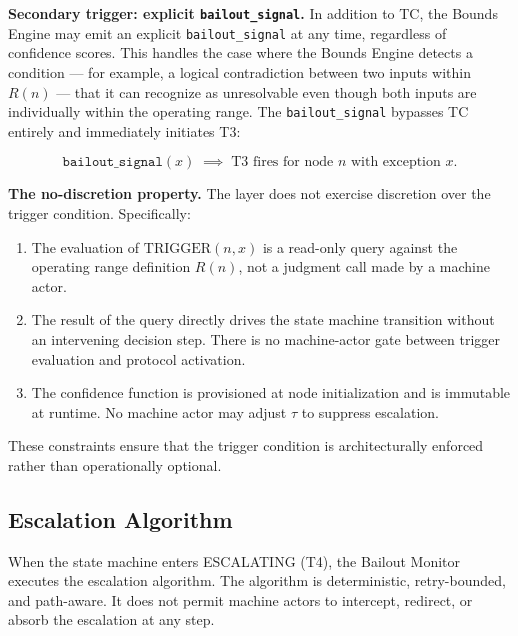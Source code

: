 \bigskip
\noindent\textbf{Secondary trigger: explicit \texttt{bailout\_signal}.} In addition to TC, the Bounds Engine may emit an explicit \texttt{bailout\_signal} at any time, regardless of confidence scores. This handles the case where the Bounds Engine detects a condition — for example, a logical contradiction between two inputs within $R(n)$ — that it can recognize as unresolvable even though both inputs are individually within the operating range. The \texttt{bailout\_signal} bypasses TC entirely and immediately initiates T3:

\begin{equation}
\texttt{bailout\_signal}(x) \;\implies\; \text{T3 fires for node } n \text{ with exception } x. \tag{TC-secondary}
\end{equation}

\bigskip
\noindent\textbf{The no-discretion property.} The \bounds{} layer does not exercise discretion over the trigger condition. Specifically:

\begin{enumerate}
    \item The evaluation of $\text{TRIGGER}(n, x)$ is a read-only query against the operating range definition $R(n)$, not a judgment call made by a machine actor.
    \item The result of the query directly drives the state machine transition without an intervening decision step. There is no machine-actor gate between trigger evaluation and protocol activation.
    \item The confidence function is provisioned at node initialization and is immutable at runtime. No machine actor may adjust $\tau$ to suppress escalation.
\end{enumerate}

These constraints ensure that the trigger condition is architecturally enforced rather than operationally optional.

\subsection{Escalation Algorithm}\label{sec:escalation-algorithm}

When the state machine enters ESCALATING (T4), the Bailout Monitor executes the escalation algorithm. The algorithm is deterministic, retry-bounded, and path-aware. It does not permit machine actors to intercept, redirect, or absorb the escalation at any step.

